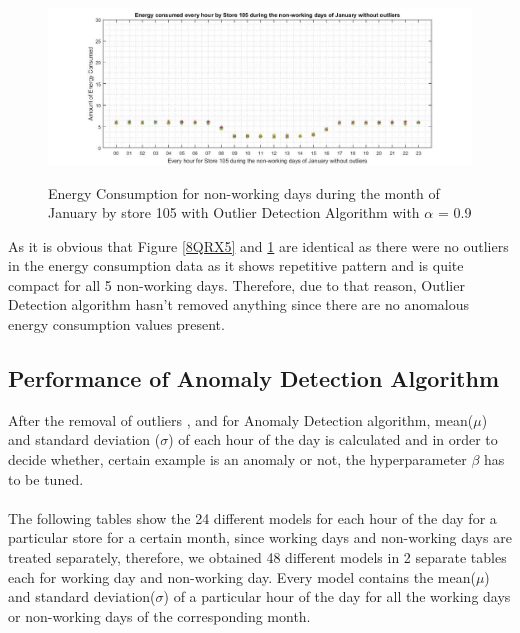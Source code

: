 \documentclass[12pt]{article}
\begin{document}
\begin{figure}[H]
	\centering
	{\includegraphics[scale=0.32]{alpha_15_nol_off.jpg}\label{9QRX5}
	}
	\caption[Energy Consumption during the month of January by store 105 (same dataset as in Figure \ref{7blockdiag}) without outliers]{Energy Consumption for non-working days during the month of January by store 105 with Outlier Detection Algorithm with $\alpha$ = 0.9}
	\label{9QRX5}
	\hspace{0.1cm}%
\end{figure}

As it is obvious that Figure \ref{8QRX5} and \ref{9QRX5} are identical as there were no outliers in the energy consumption data as it shows repetitive pattern and is quite compact for all 5 non-working days. Therefore, due to that reason, Outlier Detection algorithm hasn't removed anything since there are no anomalous energy consumption values present.


\subsection{Performance of Anomaly Detection Algorithm}

After the removal of outliers , and for Anomaly Detection algorithm, mean($\mu$) and standard deviation ($\sigma$) of each hour of the day is calculated and in order to decide whether, certain example is an anomaly or not, the hyperparameter $\beta$ has to be tuned.

\paragraph{} The following tables show the 24 different models for each hour of the day for a particular store for a certain month, since working days and non-working days are treated separately, therefore, we obtained 48 different models in 2 separate tables each for working day and non-working day. Every model contains the mean($\mu$) and standard deviation($\sigma$) of a particular hour of the day for all the working days or non-working days of the corresponding month.
\end{document}
